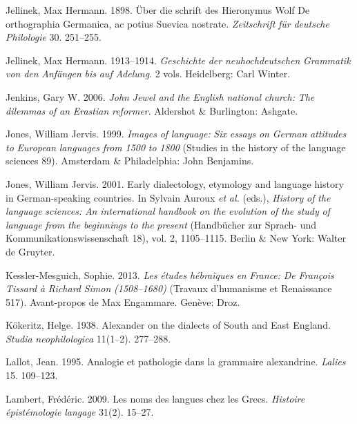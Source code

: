 Jellinek, Max Hermann. 1898. Über die schrift des Hieronymus Wolf De orthographia Germanica, ac potius Suevica nostrate. \textit{Zeitschrift} \textit{für} \textit{deutsche} \textit{Philologie} 30. 251–255.

Jellinek, Max Hermann. 1913–1914. \textit{Geschichte} \textit{der} \textit{neuhochdeutschen} \textit{Grammatik} \textit{von} \textit{den} \textit{Anfängen} \textit{bis} \textit{auf} \textit{Adelung}. 2 vols. Heidelberg: Carl Winter.

Jenkins, Gary W. 2006. \textit{John} \textit{Jewel} \textit{and} \textit{the} \textit{English} \textit{national} \textit{church:} \textit{The} \textit{dilemmas} \textit{of} \textit{an} \textit{Erastian} \textit{reformer}. Aldershot \& Burlington: Ashgate.

Jones, William Jervis. 1999. \textit{Images} \textit{of} \textit{language:} \textit{Six} \textit{essays} \textit{on} \textit{German} \textit{attitudes} \textit{to} \textit{European} \textit{languages} \textit{from} \textit{1500} \textit{to} \textit{1800} (Studies in the history of the language sciences 89). Amsterdam \& Philadelphia: John Benjamins.

Jones, William Jervis. 2001. Early dialectology, etymology and language history in German-speaking countries. In Sylvain Auroux \textit{et} \textit{al.} (eds.), \textit{History} \textit{of} \textit{the} \textit{language} \textit{sciences:} \textit{An} \textit{international} \textit{handbook} \textit{on} \textit{the} \textit{evolution} \textit{of} \textit{the} \textit{study} \textit{of} \textit{language} \textit{from} \textit{the} \textit{beginnings} \textit{to} \textit{the} \textit{present} (Handbücher zur Sprach- und Kommunikationswissenschaft 18), vol. 2, 1105–1115. Berlin \& New York: Walter de Gruyter.

Kessler-Mesguich, Sophie. 2013. \textit{Les} \textit{études} \textit{hébraïques} \textit{en} \textit{France:} \textit{De} \textit{François} \textit{Tissard} \textit{à} \textit{Richard} \textit{Simon} \textit{(1508–1680)} (Travaux d’humanisme et Renaissance 517). Avant-propos de Max Engammare. Genève: Droz.

Kökeritz, Helge. 1938. Alexander \citet{Gill1621} on the dialects of South and East England. \textit{Studia} \textit{neophilologica} 11(1–2). 277–288.

Lallot, Jean. 1995. Analogie et pathologie dans la grammaire alexandrine. \textit{Lalies} 15. 109–123.

Lambert, Frédéric. 2009. Les noms des langues chez les Grecs. \textit{Histoire} \textit{épistémologie} \textit{langage} 31(2). 15–27.

